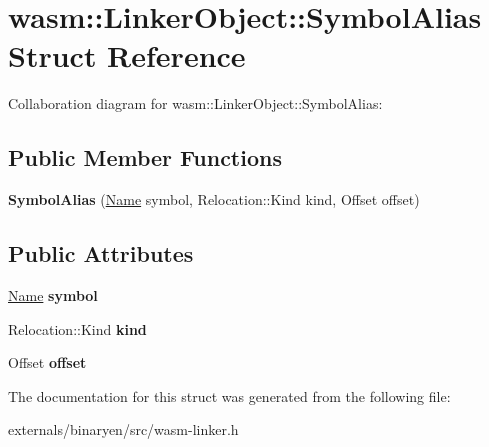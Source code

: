 \hypertarget{structwasm_1_1_linker_object_1_1_symbol_alias}{}\section{wasm\+:\+:Linker\+Object\+:\+:Symbol\+Alias Struct Reference}
\label{structwasm_1_1_linker_object_1_1_symbol_alias}


Collaboration diagram for wasm\+:\+:Linker\+Object\+:\+:Symbol\+Alias\+:
\subsection*{Public Member Functions}
\begin{DoxyCompactItemize}
\item 
\mbox{\label{structwasm_1_1_linker_object_1_1_symbol_alias_a0073649b4c838e59d8f061b62233594b}} 
{\bfseries Symbol\+Alias} (\mbox{\hyperlink{structwasm_1_1_name}{Name}} symbol, Relocation\+::\+Kind kind, Offset offset)
\end{DoxyCompactItemize}
\subsection*{Public Attributes}
\begin{DoxyCompactItemize}
\item 
\mbox{\label{structwasm_1_1_linker_object_1_1_symbol_alias_aa9cdb94aef48e91e34706d08d32653d2}} 
\mbox{\hyperlink{structwasm_1_1_name}{Name}} {\bfseries symbol}
\item 
\mbox{\label{structwasm_1_1_linker_object_1_1_symbol_alias_ae6304ba547c107e5a562030265a35304}} 
Relocation\+::\+Kind {\bfseries kind}
\item 
\mbox{\label{structwasm_1_1_linker_object_1_1_symbol_alias_a932e3c2c19575790e6b93f79c1041308}} 
Offset {\bfseries offset}
\end{DoxyCompactItemize}


The documentation for this struct was generated from the following file\+:\begin{DoxyCompactItemize}
\item 
externals/binaryen/src/wasm-\/linker.\+h\end{DoxyCompactItemize}
